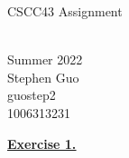 \documentclass[12pt]{article}
\begin{document}



\vspace*{\fill}
\begin{center}
    \begin{minipage}{\textwidth}
        \centering
        \hypertarget{toc}{\Huge CSCC43 Assignment}\\
        {\large Summer 2022\\[0.5cm]

        Stephen Guo\\[0cm]
        guostep2\\[-0.35cm]
        1006313231
        }
    \end{minipage}
\end{center}
\vfill %
\newpage
\noindent \hyperlink{toc}{\hypertarget{1}{\LARGE \underline{\textbf{Exercise 1.}}}}\\\\
\end{document}
